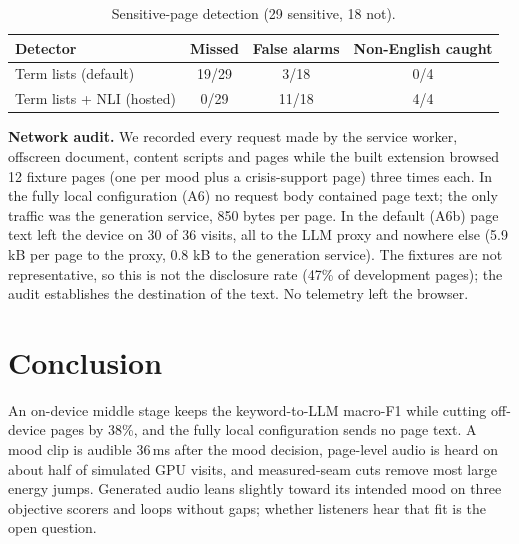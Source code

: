 \documentclass[conference]{IEEEtran}
\begin{document}
\begin{table}[t]
\caption{Sensitive-page detection (29 sensitive, 18 not).}
\label{tab:sensitive}
\begin{center}
\scriptsize
\setlength{\tabcolsep}{4pt}
\begin{tabular}{lccc}
\toprule
\textbf{Detector} & \textbf{Missed} & \textbf{False alarms} & \textbf{Non-English caught} \\
\midrule
Term lists (default)      & 19/29 & 3/18  & 0/4 \\
Term lists + NLI (hosted) & 0/29  & 11/18 & 4/4 \\
\bottomrule
\end{tabular}
\end{center}
\end{table}

\textbf{Network audit.} We recorded every request made by the service worker,
offscreen document, content scripts and pages while the built extension browsed 12
fixture pages (one per mood plus a crisis-support page) three times each. In the
fully local configuration (A6) no request body contained page text; the only
traffic was the generation service, 850 bytes per page. In the default (A6b) page
text left the device on 30 of 36 visits, all to the LLM proxy and nowhere else (5.9
kB per page to the proxy, 0.8 kB to the generation service). The fixtures are not
representative, so this is not the disclosure rate (47\% of development pages); the
audit establishes the destination of the text. No telemetry left the browser.

\section{Conclusion}
\label{sec:conclusion}

An on-device middle stage keeps the keyword-to-LLM macro-F1 while cutting
off-device pages by 38\%, and the fully local configuration sends no page text. A
mood clip is audible 36\,ms after the mood decision, page-level audio is heard on
about half of simulated GPU visits, and measured-seam cuts remove most large
energy jumps. Generated audio leans slightly toward its intended mood on three
objective scorers and loops without gaps; whether listeners hear that fit is the
open question.

\end{document}
